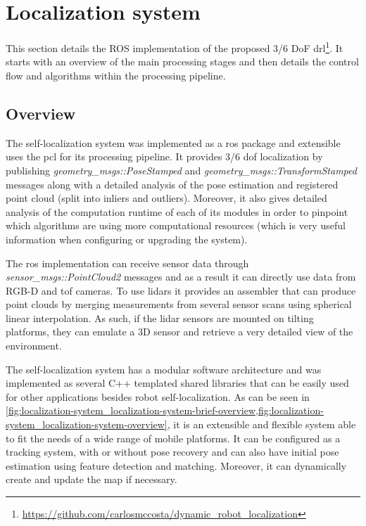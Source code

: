 \section{Localization system}\label{sec:localization-system}

This section details the ROS implementation of the proposed 3/6 DoF \gls{drl}\footnote{\url{https://github.com/carlosmccosta/dynamic_robot_localization}}. It starts with an overview of the main processing stages and then details the control flow and algorithms within the processing pipeline.

\subsection{Overview}

The self-localization system was implemented as a \gls{ros} package and extensible uses the \gls{pcl} \cite{Rusu2011} for its processing pipeline. It provides 3/6 \gls{dof} localization by publishing \emph{geometry\_msgs::PoseStamped} and \emph{geometry\_msgs::TransformStamped} messages along with a detailed analysis of the pose estimation and registered point cloud (split into inliers and outliers). Moreover, it also gives detailed analysis of the computation runtime of each of its modules in order to pinpoint which algorithms are using more computational resources (which is very useful information when configuring or upgrading the system).

The \gls{ros} implementation can receive sensor data through \emph{sensor\_msgs::PointCloud2} messages and as a result it can directly use data from RGB-D and \gls{tof} cameras. To use \glspl{lidar} it provides an assembler that can produce point clouds by merging measurements from several sensor scans using spherical linear interpolation. As such, if the \gls{lidar} sensors are mounted on tilting platforms, they can emulate a 3D sensor and retrieve a very detailed view of the environment.

The self-localization system has a modular software architecture and was implemented as several C++ templated shared libraries that can be easily used for other applications besides robot self-localization. As can be seen in \cref{fig:localization-system_localization-system-brief-overview,fig:localization-system_localization-system-overview}, it is an extensible and flexible system able to fit the needs of a wide range of mobile platforms. It can be configured as a tracking system, with or without pose recovery and can also have initial pose estimation using feature detection and matching. Moreover, it can dynamically create and update the map if necessary.


